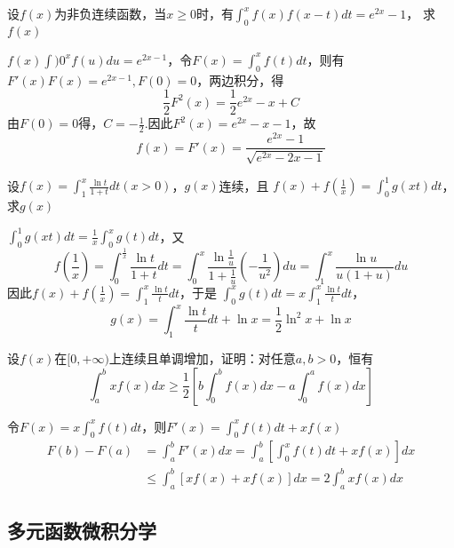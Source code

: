 \documentclass{article}
\begin{document}
\begin{examplle}[]
设\(f(x)\)为非负连续函数，当\(x\ge0\)时，有\(\int_0^xf(x)f(x-t)dt=e^{2x}-1\)，
求\(f(x)\)

\(f(x)\int)0^xf(u)du=e^{2x-1}\)，令\(F(x)=\int_0^xf(t)dt\)，则有
\(F'(x)F(x)=e^{2x-1},F(0)=0\)，两边积分，得
\begin{equation*}
\frac{1}{2}F^2(x)=\frac{1}{2}e^{2x}-x+C
\end{equation*}
由\(F(0)=0\)得，\(C=-\frac{1}{2}\).因此\(F^2(x)=e^{2x}-x-1\)，故
\begin{equation*}
f(x)=F'(x)=\frac{e^{2x}-1}{\sqrt{e^{2x}-2x-1}}
\end{equation*}
\end{examplle}

\begin{examplle}[]
设\(\displaystyle f(x)=\int_1^x\frac{\ln t}{1+t}dt(x>0)\)，\(g(x)\)连续，且
\(f(x)+f(\frac{1}{x})=\int_0^1g(xt)dt\)，求\(g(x)\)

\(\int_0^1g(xt)dt=\frac{1}{x}\int_0^xg(t)dt\)，又
\begin{equation*}
f(\frac{1}{x})=\int_0^{\frac{1}{x}}\frac{\ln t}{1+t}dt=
\int_0^x\frac{\ln\frac{1}{u}}{1+\frac{1}{u}}(-\frac{1}{u^2})du=
\int_1^x\frac{\ln u}{u(1+u)}du
\end{equation*}
因此\(f(x)+f(\frac{1}{x})=\int_1^x\frac{\ln t}{t}dt\)，于是
\(\int_0^xg(t)dt=x\int_1^x\frac{\ln t}{t}dt\)，
\begin{equation*}
g(x)=\int_1^x\frac{\ln t}{t}dt+\ln x=\frac{1}{2}\ln^2x+\ln x
\end{equation*}
\end{examplle}

\begin{examplle}[]
设\(f(x)\)在\([0,+\infty)\)上连续且单调增加，证明：对任意\(a,b>0\)，恒有
\begin{equation*}
\int_a^bxf(x)dx\ge\frac{1}{2}\left[
b\int_0^bf(x)dx-a\int_0^af(x)dx
\right]
\end{equation*}

令\(F(x)=x\int_0^xf(t)dt\)，则\(F'(x)=\int_0^xf(t)dt+xf(x)\)
\begin{align*}
F(b)-F(a)&=\int_a^bF'(x)dx=\int_a^b
\left[\int_0^xf(t)dt+xf(x)
\right]dx\\
&\le\int_a^b[xf(x)+xf(x)]dx=2\int_a^bxf(x)dx
\end{align*}
\end{examplle}
\subsection{多元函数微积分学}
\label{sec:org40708f7}
\end{document}
